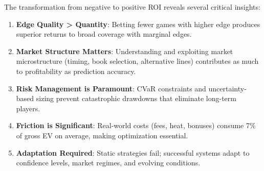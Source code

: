 The transformation from negative to positive ROI reveals several critical insights:

\begin{enumerate}
  \item \textbf{Edge Quality > Quantity}: Betting fewer games with higher edge produces superior returns to broad coverage with marginal edges.

  \item \textbf{Market Structure Matters}: Understanding and exploiting market microstructure (timing, book selection, alternative lines) contributes as much to profitability as prediction accuracy.

  \item \textbf{Risk Management is Paramount}: CVaR constraints and uncertainty-based sizing prevent catastrophic drawdowns that eliminate long-term players.

  \item \textbf{Friction is Significant}: Real-world costs (fees, heat, bonuses) consume 7\% of gross EV on average, making optimization essential.

  \item \textbf{Adaptation Required}: Static strategies fail; successful systems adapt to confidence levels, market regimes, and evolving conditions.
\end{enumerate}
